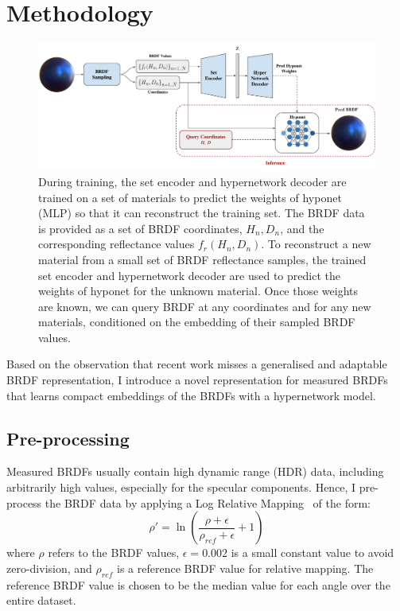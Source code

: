 \section{Methodology}

\begin{figure}[t]
  \centering

   \includegraphics[width=\linewidth]{Chapters/hyperbrdf-figs/MainFig_13_11.pdf}
   \caption{During training, the set encoder and hypernetwork decoder are trained on a set of materials to predict the weights of hyponet (MLP) so that it can reconstruct the training set. The BRDF data is provided as a set of BRDF coordinates, $H_n,D_n$, and the corresponding reflectance values $f_r(H_n,D_n)$. To reconstruct a new material from a small set of BRDF reflectance samples, the trained set encoder and hypernetwork decoder are used to predict the weights of hyponet for the unknown material. Once those weights are known, we can query BRDF at any coordinates and for any new materials, conditioned on the embedding of their sampled BRDF values.}
   \label{fig:mainfig} \end{figure}

Based on the observation that recent work misses a generalised and adaptable \gls{BRDF} representation, I introduce a novel representation for measured \gls{BRDF}s that learns compact embeddings of the \gls{BRDF}s with a hypernetwork model.

\subsection{Pre-processing}\label{sec:pre-proc}

Measured \gls{BRDF}s usually contain high dynamic range (\gls{HDR}) data, including arbitrarily high values, especially for the specular components. Hence, I pre-process the \gls{BRDF} data by applying a Log Relative Mapping~\cite{nielsen2015optimal} of the form:
\begin{equation}
  \rho' = \ln{\left(\frac{\rho + \epsilon}{\rho_{ref} + \epsilon} +1\right)}
  \label{eq:preprocess}
\end{equation}
where $\rho$ refers to the \gls{BRDF} values, $\epsilon = 0.002$ is a small constant value to avoid zero-division, and $\rho_{ref}$ is a reference \gls{BRDF} value for relative mapping. The reference \gls{BRDF} value is chosen to be the median value for each angle over the entire dataset.


